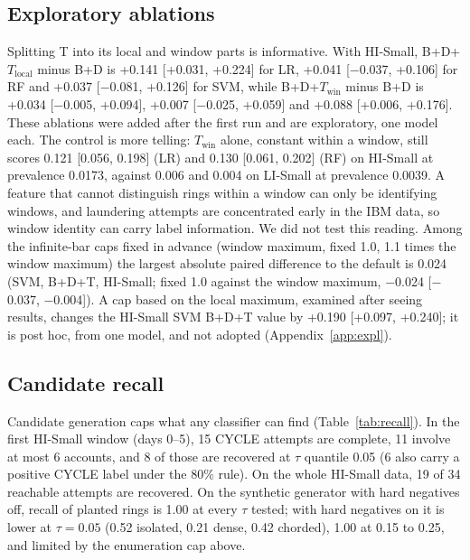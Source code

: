 \documentclass[conference]{IEEEtran}
\newcommand{\mi}{\ensuremath{-}}
\begin{document}
\subsection{Exploratory ablations}
Splitting T into its local and window parts is informative. With HI-Small, B+D+$T_{\mathrm{local}}$ minus B+D is +0.141 [+0.031, +0.224] for LR, +0.041 [\mi0.037, +0.106] for RF and +0.037 [\mi0.081, +0.126] for SVM, while B+D+$T_{\mathrm{win}}$ minus B+D is +0.034 [\mi0.005, +0.094], +0.007 [\mi0.025, +0.059] and +0.088 [+0.006, +0.176]. These ablations were added after the first run and are exploratory, one model each. The control is more telling: $T_{\mathrm{win}}$ alone, constant within a window, still scores 0.121 [0.056, 0.198] (LR) and 0.130 [0.061, 0.202] (RF) on HI-Small at prevalence 0.0173, against 0.006 and 0.004 on LI-Small at prevalence 0.0039. A feature that cannot distinguish rings within a window can only be identifying windows, and laundering attempts are concentrated early in the IBM data, so window identity can carry label information. We did not test this reading. Among the infinite-bar caps fixed in advance (window maximum, fixed 1.0, 1.1 times the window maximum) the largest absolute paired difference to the default is 0.024 (SVM, B+D+T, HI-Small; fixed 1.0 against the window maximum, \mi0.024 [\mi0.037, \mi0.004]). A cap based on the local maximum, examined after seeing results, changes the HI-Small SVM B+D+T value by +0.190 [+0.097, +0.240]; it is post hoc, from one model, and not adopted (Appendix~\ref{app:expl}).

\subsection{Candidate recall}
Candidate generation caps what any classifier can find (Table~\ref{tab:recall}). In the first HI-Small window (days 0--5), 15 CYCLE attempts are complete, 11 involve at most 6 accounts, and 8 of those are recovered at $\tau$ quantile 0.05 (6 also carry a positive CYCLE label under the 80\% rule). On the whole HI-Small data, 19 of 34 reachable attempts are recovered. On the synthetic generator with hard negatives off, recall of planted rings is 1.00 at every $\tau$ tested; with hard negatives on it is lower at $\tau=0.05$ (0.52 isolated, 0.21 dense, 0.42 chorded), 1.00 at 0.15 to 0.25, and limited by the enumeration cap above.
\end{document}
